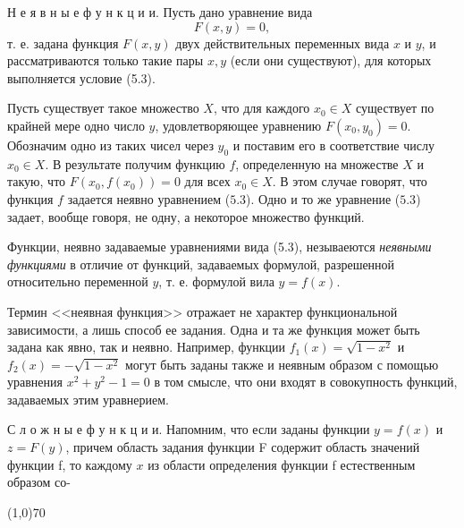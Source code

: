 \documentclass[12pt, legalpaper]{article}
\begin{document}
Н е я в н ы е  ф у н к ц и и. Пусть дано уравнение вида
\begin{equation}\tag{5.3}
F(x, y) = 0,    
\end{equation}
т. е. задана функция $F(x, y)$ двух действительных переменных вида $x$ и $y$, и рассматриваются только такие пары $x, y$ (если они существуют), для которых выполняется условие (5.3).

Пусть существует такое множество $X$, что для каждого $x_0 \in X$ существует по крайней мере одно число $y$, удовлетворяющее уравнению $F(x_0, y_0) = 0$. Обозначим одно из таких чисел через $y_0$ и поставим его в соответствие числу $x_0 \in X$. В результате получим функцию $f$, определенную на множестве $X$ и такую, что $F(x_0, f(x_0)) = 0$ для всех $x_0 \in X$. В этом случае говорят, что функция $f$ задается неявно уравнением ($5.3$). Одно и то же уравнение ($5.3$) задает, вообще говоря, не одну, а некоторое множество функций.

Функции, неявно задаваемые уравнениями вида (5.3), незываеются \textit{неявными функциями} в отличие от функций, задаваемых формулой, разрешенной относительно переменной $y$, т. е. формулой вила $y = f(x)$.

Термин <<неявная функция>> отражает не характер функциональной зависимости, а лишь способ ее задания. Одна и та же функция может быть задана как явно, так и неявно. Например, функции $f_1(x) = \sqrt{1 - x^2}$ и $f_2(x) = -\sqrt{1 - x^2}$ могут быть заданы также и неявным образом с помощью уравнения $x^2 + y^2 - 1 = 0$ в том смысле, что они входят в совокупность функций, задаваемых этим уравнерием.

С л о ж н ы е  ф у н к ц и и. Напомним, что если заданы функции $y = f(x)$ и $z = F(y)$, причем область задания функции F содержит область значений функции f, то каждому $x$ из области определения функции f естественным образом со-
\newline
\newline
\begin{center}
   \line(1,0){70}
\end{center}
\end{document}
